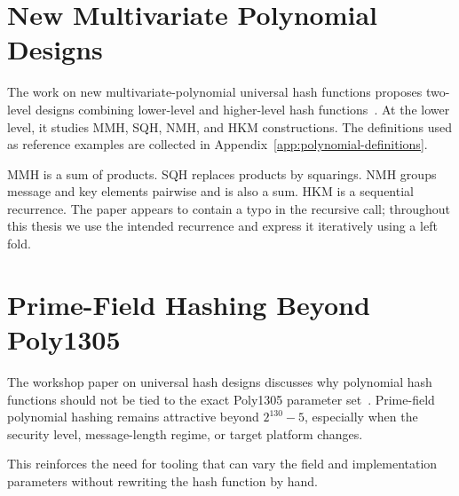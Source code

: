 \section{New Multivariate Polynomial Designs}
\label{sec:newdesigns}

The work on new multivariate-polynomial universal hash functions proposes two-level designs combining lower-level and higher-level hash functions~\cite{gilcher2026newdesigns}. At the lower level, it studies MMH, SQH, NMH, and HKM constructions. The definitions used as reference examples are collected in Appendix~\ref{app:polynomial-definitions}.

MMH is a sum of products. SQH replaces products by squarings. NMH groups message and key elements pairwise and is also a sum. HKM is a sequential recurrence. The paper appears to contain a typo in the recursive call; throughout this thesis we use the intended recurrence and express it iteratively using a left fold.

\section{Prime-Field Hashing Beyond Poly1305}
\label{sec:prime-field-beyond-poly1305}

The workshop paper on universal hash designs discusses why polynomial hash functions should not be tied to the exact Poly1305 parameter set~\cite{degabriele2024accordion}. Prime-field polynomial hashing remains attractive beyond \(2^{130}-5\), especially when the security level, message-length regime, or target platform changes.

This reinforces the need for tooling that can vary the field and implementation parameters without rewriting the hash function by hand.
